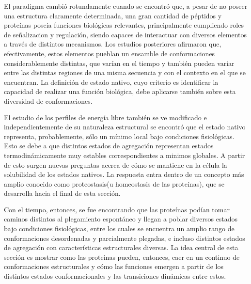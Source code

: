 El paradigma cambió rotundamente cuando se encontró que, a pesar de no poseer una estructura claramente determinada, una gran cantidad de péptidos y proteínas poseía funciones biológicas relevantes,
principalmente cumpliendo roles de señalizacion y regulación, siendo capaces de interactuar con diversos elementos a través de distintos mecanismos.
Los estudios posteriores afirmaron que, efectivamente, estos elementos pueblan un ensamble de conformaciones considerablemente distintas, que varían en el tiempo y también pueden variar entre 
las distintas regiones de una misma secuencia y con el contexto en el que se encuentran.
La definición de estado nativo, cuyo criterio es identificar la capacidad de realizar una función biológica, debe aplicarse también sobre esta diversidad de conformaciones.

El estudio de los perfiles de energía libre también se ve modificado e independientemente de su naturaleza estructural se encontró que el estado nativo representa, probablemente, sólo un mínimo local bajo condiciones fisiológicas.
Esto se debe a que distintos estados de agregación representan estados termodinámicamente muy estables correspondientes a minimos globales. 
A partir de esto surgen nuevas preguntas acerca de cómo se mantiene en la célula la solubilidad de los estados nativos.
La respuesta entra dentro de un concepto más amplio conocido como proteostasis(u homeostasis de las proteínas), que se desarrolla hacia el final de esta sección.

Con el tiempo, entonces, se fue encontrando que las proteínas podían tomar caminos distintos al plegamiento espontáneo y llegan a poblar diversos estados bajo condiciones fisiológicas, 
entre los cuales se encuentra un amplio rango de conformaciones desordenadas y parcialmente plegadas, e incluso distintos estados de agregación con características estructurales diversas.
La idea central de esta sección es mostrar como las proteinas pueden, entonces, caer en un continuo de conformaciones estructurales y cómo las funciones 
emergen a partir de los distintos estados conformacionales y las transiciones dinámicas entre estos.


